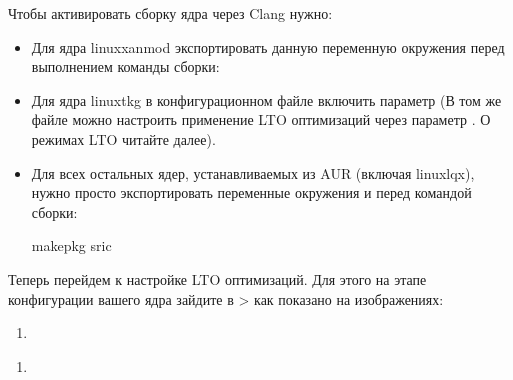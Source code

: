 \documentclass[letterpaper,10pt,russian,openany]{sphinxmanual}
\begin{document}
\sphinxAtStartPar
Чтобы активировать сборку ядра через Clang нужно:
\begin{itemize}
\item {} 
\sphinxAtStartPar
Для ядра linux\sphinxhyphen{}xanmod экспортировать данную переменную окружения перед выполнением команды сборки: 

\item {} 
\sphinxAtStartPar
Для ядра linux\sphinxhyphen{}tkg в конфигурационном файле  включить параметр 
(В том же файле можно настроить применение LTO оптимизаций через параметр . О режимах LTO читайте далее).

\item {} 
\sphinxAtStartPar
Для всех остальных ядер, устанавливаемых из AUR (включая linux\sphinxhyphen{}lqx), нужно просто экспортировать переменные окружения  и  перед командой сборки:

\begin{sphinxVerbatim}[commandchars=\\\{\}]
   
makepkg \PYGZhy{}sric            
\end{sphinxVerbatim}

\end{itemize}

\sphinxAtStartPar
Теперь перейдем к настройке LTO оптимизаций.
Для этого на этапе конфигурации вашего ядра зайдите в  \sphinxhyphen{}>
 как показано на изображениях:
\begin{enumerate}
%
\item {} 
\end{enumerate}

\noindent{}
\begin{enumerate}
%
\setcounter{enumi}{1}
\item {} 
\end{enumerate}
\end{document}
